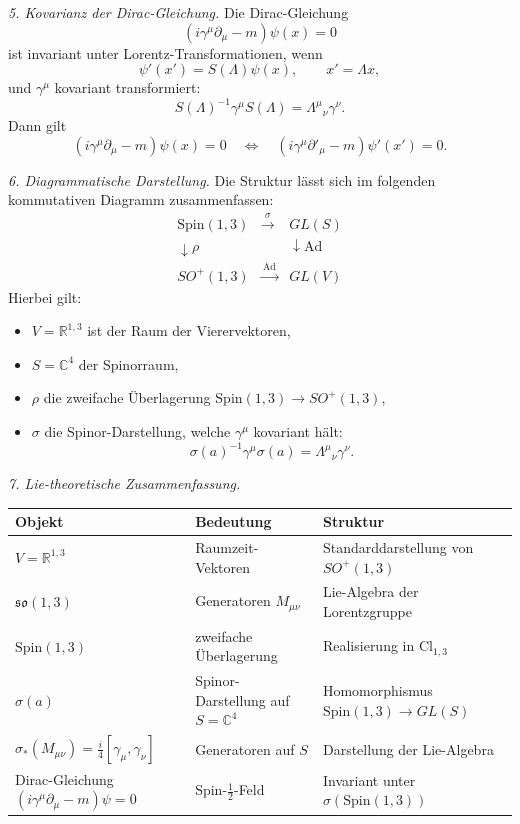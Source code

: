 \documentclass[10pt, letterpaper]{article}
\newcommand{\R}{\mathbb{R}}
\newcommand{\C}{\mathbb{C}}
\newcommand{\Cl}{\mathrm{Cl}}
\newcommand{\Spin}{\mathrm{Spin}}
\begin{document}
\emph{5. Kovarianz der Dirac-Gleichung.}
Die Dirac-Gleichung
\[
(i\gamma^\mu\partial_\mu - m)\psi(x)=0
\]
ist invariant unter Lorentz-Transformationen, wenn
\[
\psi'(x') = S(\Lambda)\psi(x),\qquad x'=\Lambda x,
\]
und $\gamma^\mu$ kovariant transformiert:
\[
S(\Lambda)^{-1}\gamma^\mu S(\Lambda)=\Lambda^\mu{}_\nu\gamma^\nu.
\]
Dann gilt
\[
(i\gamma^\mu\partial_\mu - m)\psi(x)=0
\quad\Longleftrightarrow\quad
(i\gamma^\mu\partial'_\mu - m)\psi'(x')=0.
\]

\emph{6. Diagrammatische Darstellung.}
Die Struktur lässt sich im folgenden kommutativen Diagramm zusammenfassen:
\[
\begin{array}{ccc}
\Spin(1,3) & \xrightarrow{\ \sigma\ } & GL(S)\\[0.4em]
\downarrow\rho & & \downarrow\mathrm{Ad}\\[0.4em]
SO^+(1,3) & \xrightarrow{\ \mathrm{Ad}\ } & GL(V)
\end{array}
\]
Hierbei gilt:
\begin{itemize}
\item $V=\R^{1,3}$ ist der Raum der Vierervektoren,
\item $S=\C^4$ der Spinorraum,
\item $\rho$ die zweifache Überlagerung $\Spin(1,3)\to SO^+(1,3)$,
\item $\sigma$ die Spinor-Darstellung, welche $\gamma^\mu$ kovariant hält:
  \[
  \sigma(a)^{-1}\gamma^\mu\sigma(a)=\Lambda^\mu{}_\nu\gamma^\nu.
  \]
\end{itemize}

\emph{7. Lie-theoretische Zusammenfassung.}
\begin{center}
\renewcommand{\arraystretch}{1.2}
\begin{tabular}{lll}
Objekt & Bedeutung & Struktur\\
\hline
$V=\R^{1,3}$ & Raumzeit-Vektoren & Standarddarstellung von $SO^+(1,3)$\\
$\mathfrak{so}(1,3)$ & Generatoren $M_{\mu\nu}$ & Lie-Algebra der Lorentzgruppe\\
$\Spin(1,3)$ & zweifache Überlagerung & Realisierung in $\Cl_{1,3}$\\
$\sigma(a)$ & Spinor-Darstellung auf $S=\C^4$ & Homomorphismus $\Spin(1,3)\to GL(S)$\\
$\sigma_*(M_{\mu\nu})=\frac{i}{4}[\gamma_\mu,\gamma_\nu]$ & Generatoren auf $S$ & Darstellung der Lie-Algebra\\
Dirac-Gleichung $(i\gamma^\mu\partial_\mu-m)\psi=0$ & Spin-$\tfrac12$-Feld & Invariant unter $\sigma(\Spin(1,3))$
\end{tabular}
\end{center}
\end{document}
